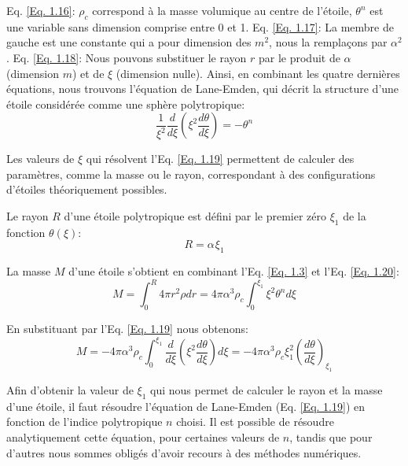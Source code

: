 Eq. \ref{Eq. 1.16}: $\rho_{c}$ correspond à la masse volumique au centre de l'étoile, $\theta^{n}$ est une variable sans dimension
comprise entre 0 et 1.\smallskip\newline
Eq. \ref{Eq. 1.17}: La membre de gauche est une constante qui a pour dimension des $m^{2}$, nous la remplaçons par $\alpha^{2}$.\smallskip\newline
Eq. \ref{Eq. 1.18}: Nous pouvons substituer le rayon $r$ par le produit de $\alpha$ (dimension $m$) et de $\xi$ (dimension nulle).\bigskip
Ainsi, en combinant les quatre dernières équations, nous trouvons l'équation de Lane-Emden\footnotemark[6], qui décrit la structure d'une étoile considérée comme une sphère polytropique:\begin{equation}\boxed{\dfrac{1}{\xi^{2}}\dfrac{d}{d\xi}\left( \xi^{2}\dfrac{d\theta}{d\xi}\right) =-\theta^{n}}\label{Eq. 1.19}\end{equation}

Les valeurs de $\xi$ qui résolvent l'Eq. \ref{Eq. 1.19} permettent de calculer des paramètres, comme la masse ou le rayon\footnotemark[7], correspondant à des configurations d'étoiles théoriquement possibles.\smallskip 

Le rayon $R$ d'une étoile polytropique est défini par le premier zéro $\xi_{1}$ de la fonction $\theta(\xi)$\footnotemark[8]:\begin{equation}R=\alpha\hspace{1pt}\xi_{1}\label{Eq. 1.20}\end{equation}

La masse $M$ d'une étoile s'obtient en combinant l'Eq. \ref{Eq. 1.3} et l'Eq. \ref{Eq. 1.20}:\begin{equation}M=\int_{0}^{R}4\pi r^{2}\rho dr=4\pi \alpha^{3} \rho_{c}\int_{0}^{\xi_{1}}\xi^{2}\theta^{n}d\xi\label{Eq. 1.21}\end{equation}

En substituant par l'Eq. \ref{Eq. 1.19} nous obtenons:\begin{equation}M=-4\pi \alpha^{3}\rho_{c}\int_{0}^{\xi_{1}}\dfrac{d}{d\xi}\left(\xi^2\dfrac{d\theta}{d\xi}\right)d\xi=-4\pi \alpha^{3}\rho_{c}\xi^{2}_{1}\left( \dfrac{d\theta}{d\xi}\right)_{\xi_{1}}\label{Eq. 1.22}\end{equation}\bigskip

Afin d'obtenir la valeur de $\xi_{1}$ qui nous permet de calculer le rayon et la masse d'une étoile, il faut résoudre l'équation de Lane-Emden (Eq. \ref{Eq. 1.19}) en fonction de l'indice polytropique $n$ choisi. Il est possible de résoudre analytiquement cette équation, pour certaines valeurs de $n$, tandis que pour d'autres nous sommes obligés d'avoir recours à des méthodes numériques.\smallskip 

